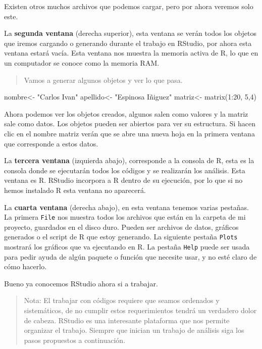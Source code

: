 \documentclass[
]{article}
\newenvironment{Shaded}{\begin{snugshade}}{\end{snugshade}}
\newcommand{\DecValTok}[1]{\textcolor[rgb]{0.00,0.00,0.81}{#1}}
\newcommand{\FunctionTok}[1]{\textcolor[rgb]{0.00,0.00,0.00}{#1}}
\newcommand{\NormalTok}[1]{#1}
\newcommand{\OtherTok}[1]{\textcolor[rgb]{0.56,0.35,0.01}{#1}}
\newcommand{\SpecialCharTok}[1]{\textcolor[rgb]{0.00,0.00,0.00}{#1}}
\newcommand{\StringTok}[1]{\textcolor[rgb]{0.31,0.60,0.02}{#1}}
\begin{document}
Existen otros muchos archivos que podemos cargar, pero por ahora veremos
solo este.

La \textbf{segunda ventana} (derecha superior), esta ventana se verán
todos los objetos que iremos cargando o generando durante el trabajo en
RStudio, por ahora esta ventana estará vacía. Esta ventana nos muestra
la memoria activa de R, lo que en un computador se conoce como la
memoria RAM.

\begin{quote}
Vamos a generar algunos objetos y ver lo que pasa.
\end{quote}

\begin{Shaded}
\begin{Highlighting}[]
\NormalTok{nombre}\OtherTok{\textless{}{-}} \StringTok{"Carlos Ivan"}
\NormalTok{apellido}\OtherTok{\textless{}{-}} \StringTok{"Espinosa Iñiguez"}
\NormalTok{matriz}\OtherTok{\textless{}{-}} \FunctionTok{matrix}\NormalTok{(}\DecValTok{1}\SpecialCharTok{:}\DecValTok{20}\NormalTok{, }\DecValTok{5}\NormalTok{,}\DecValTok{4}\NormalTok{)}
\end{Highlighting}
\end{Shaded}

Ahora podemos ver los objetos creados, algunos salen como valores y la
matriz sale como datos. Los objetos pueden ser abiertos para ver su
estructura. Si hacen clic en el nombre matriz verán que se abre una
nueva hoja en la primera ventana que corresponde a estos datos.

La \textbf{tercera ventana} (izquierda abajo), corresponde a la consola
de R, esta es la consola donde se ejecutarán todos los códigos y se
realizarán los análisis. Esta ventana es R. RStudio incorpora a R dentro
de su ejecución, por lo que si no hemos instalado R esta ventana no
aparecerá.

La \textbf{cuarta ventana} (derecha abajo), en esta ventana tenemos
varias pestañas. La primera \texttt{File} nos muestra todos los archivos
que están en la carpeta de mi proyecto, guardados en el disco duro.
Pueden ser archivos de datos, gráficos generados o el script de R que
estoy generando. La siguiente pestaña \texttt{Plots} mostrará los
gráficos que va ejecutando en R. La pestaña \texttt{Help} puede ser
usada para pedir ayuda de algún paquete o función que necesite usar, y
no esté claro de cómo hacerlo.

Bueno ya conocemos RStudio ahora si a trabajar.

\begin{quote}
Nota: El trabajar con códigos requiere que seamos ordenados y
sistemáticos, de no cumplir estos requerimientos tendrá un verdadero
dolor de cabeza. RStudio es una interesante plataforma que nos permite
organizar el trabajo. Siempre que inician un trabajo de análisis siga
los pasos propuestos a continuación.
\end{quote}
\end{document}
